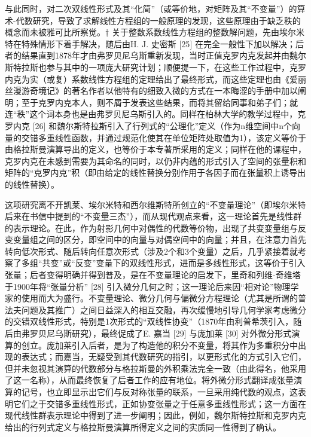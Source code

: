 与此同时，对二次双线性形式及其“化简”（或等价地，对矩阵及其“不变量”）的算术-代数研究，导致了求解线性方程组的一般原理的发现，这些原理由于缺乏秩的概念而未被雅可比所察觉。† 关于整数系数线性方程组的整数解问题，先由埃尔米特在特殊情形下着手解决，随后由H. J. 史密斯 {[}25{]} 在完全一般性下加以解决；后者的结果直到1878年才由弗罗贝尼乌斯重新发现，当时正值克罗内克发起并由魏尔斯特拉斯也参与其中的一项庞大研究计划；顺便提一下，在这些工作过程中，克罗内克为实（或复）系数线性方程组的定理给出了最终形式，而这些定理也由《爱丽丝漫游奇境记》的著名作者以他特有的细致入微的方式在一本晦涩的手册中加以阐明；至于克罗内克本人，则不屑于发表这些结果，而将其留给同事和弟子们；就连“秩”这个词本身也是由弗罗贝尼乌斯引入的。同样在柏林大学的教学过程中，克罗内克 {[}26{]} 和魏尔斯特拉斯引入了行列式的“公理化”定义（作为n维空间中n个向量的交错多重线性函数，并通过规范化使其在单位矩阵处取值为1），该定义等价于由格拉斯曼演算导出的定义，也等价于本专著所采用的定义；同样在他的课程中，克罗内克在未感到需要为其命名的同时，以仍非内蕴的形式引入了空间的张量积和矩阵的“克罗内克”积（即由给定的线性替换分别作用于各因子而在张量积上诱导出的线性替换）。

这项研究离不开凯莱、埃尔米特和西尔维斯特所创立的“不变量理论”（即埃尔米特后来在书信中提到的“不变量三杰”），而从现代观点来看，这一理论首先是线性群的表示理论。在此，作为射影几何中对偶性的代数等价物，出现了共变变量组与反变变量组之间的区分，即空间中的向量与对偶空间中的向量；并且，在注意力首先转向低次形式、随后转向任意次形式（涉及2个和3个变量）之后，几乎紧接着就考察了多组“共变”或“反变”变量下的双线性形式，进而是多线性形式，这等价于引入张量；后者变得明确并得到普及，是在不变量理论的启发下，里奇和列维-奇维塔于1900年将“张量分析” {[}28{]} 引入微分几何之时；这一理论后来因“相对论”物理学家的使用而大为盛行。不变量理论、微分几何与偏微分方程理论（尤其是所谓的普法夫问题及其推广）之间日益深入的相互交融，再次缓慢地引导几何学家考虑微分的交错双线性形式，特别是1次形式的“双线性协变”（1870年由利普希茨引入，随后由弗罗贝尼乌斯研究），最终促成了E. 嘉当 {[}29{]} 与庞加莱 {[}30{]} 对外微分形式演算的创立。庞加莱引入后者，是为了构造他的积分不变量，将其作为多重积分中出现的表达式；而嘉当，无疑受到其代数研究的指引，以更形式化的方式引入它们，但并未忽视其演算的代数部分与格拉斯曼的外积乘法完全一致（由此得名，他采用了这一名称），从而最终恢复了后者工作的应有地位。将外微分形式翻译成张量演算的记号，也立即显示出它们与反对称张量的联系，一旦采用纯代数的观点，这表明它们之于交错多重线性形式，正如协变张量之于任意多重线性形式；这一方面在现代线性群表示理论中得到了进一步阐明；因此，例如，魏尔斯特拉斯和克罗内克给出的行列式定义与格拉斯曼演算所得定义之间的实质同一性得到了确认。

